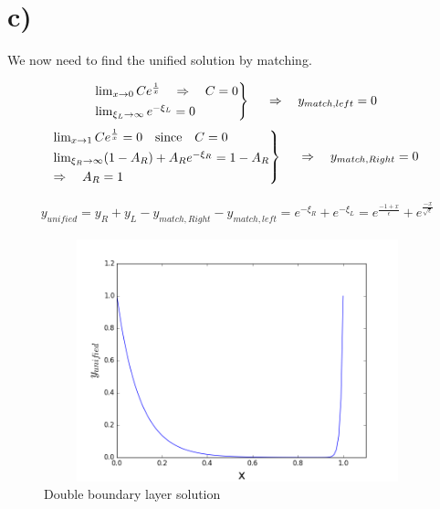 \documentclass[a4paper,10pt]{article}
\begin{document}
\section*{c)}
We now need to find the unified solution by matching.

\[
\begin{rcases}
\lim_{x \to 0} Ce^{\frac{1}{x}} \quad \Rightarrow \quad C=0 \\
\lim_{\xi_L \to \infty} e^{-\xi_L} = 0
\end{rcases}
\quad
\begin{array}{r@{\;}l} %
\Rightarrow \quad y_{match,left} = 0 
\end{array}
\]
\vspace{8mm}
\[
\begin{rcases}
\lim_{x \to 1} Ce^{\frac{1}{x}}=0 \quad \text{since} \quad C=0 \\
\lim_{\xi_R \to \infty} (1-A_R)+A_R e^{-\xi_R} = 1-A_R\\
\Rightarrow \quad A_R=1
\end{rcases}
\quad
\begin{array}{r@{\;}l} %
\Rightarrow \quad y_{match,Right} = 0 
\end{array}
\]

\begin{align}
y_{unified} = y_R + y_L - y_{match,Right} - y_{match,left} = e^{-\xi_R} + e^{-\xi_L} = e^{\frac{-1+x}{\epsilon}} + e^{\frac{-x}{\sqrt{\epsilon}}}
\end{align}

\begin{figure}[H]
    \centering
    \includegraphics[width=12cm, height=7cm]{figure_1.png}
    \caption{Double boundary layer solution}
    \label{fig:1}
\end{figure}
\end{document}

